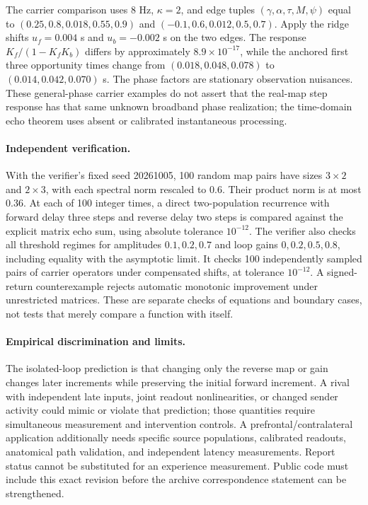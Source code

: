 \documentclass[11pt,a4paper]{article}
\begin{document}
The carrier comparison uses 8 Hz, $\kappa=2$, and edge tuples $(\gamma,\alpha,\tau,M,\psi)$ equal to $(0.25,0.8,0.018,0.55,0.9)$ and $(-0.1,0.6,0.012,0.5,0.7)$. Apply the ridge shifts $u_f=0.004$ s and $u_b=-0.002$ s on the two edges. The response $K_f/(1-K_fK_b)$ differs by approximately $8.9\times10^{-17}$, while the anchored first three opportunity times change from $(0.018,0.048,0.078)$ to $(0.014,0.042,0.070)$ s. The phase factors are stationary observation nuisances. These general-phase carrier examples do not assert that the real-map step response has that same unknown broadband phase realization; the time-domain echo theorem uses absent or calibrated instantaneous processing.

\paragraph{Independent verification.} With the verifier's fixed seed 20261005, 100 random map pairs have sizes $3\times2$ and $2\times3$, with each spectral norm rescaled to 0.6. Their product norm is at most 0.36. At each of 100 integer times, a direct two-population recurrence with forward delay three steps and reverse delay two steps is compared against the explicit matrix echo sum, using absolute tolerance $10^{-12}$. The verifier also checks all threshold regimes for amplitudes $0.1,0.2,0.7$ and loop gains $0,0.2,0.5,0.8$, including equality with the asymptotic limit. It checks 100 independently sampled pairs of carrier operators under compensated shifts, at tolerance $10^{-12}$. A signed-return counterexample rejects automatic monotonic improvement under unrestricted matrices. These are separate checks of equations and boundary cases, not tests that merely compare a function with itself.

\paragraph{Empirical discrimination and limits.} The isolated-loop prediction is that changing only the reverse map or gain changes later increments while preserving the initial forward increment. A rival with independent late inputs, joint readout nonlinearities, or changed sender activity could mimic or violate that prediction; those quantities require simultaneous measurement and intervention controls. A prefrontal/contralateral application additionally needs specific source populations, calibrated readouts, anatomical path validation, and independent latency measurements. Report status cannot be substituted for an experience measurement. Public code must include this exact revision before the archive correspondence statement can be strengthened.
\end{document}
